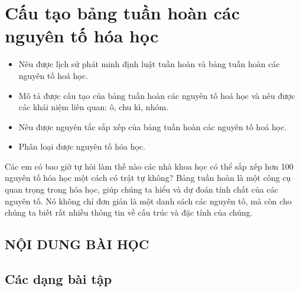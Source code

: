 \section{Cấu tạo bảng tuần hoàn các nguyên tố hóa học}
\begin{Muctieu}
	\begin{itemize}
		\item  Nêu được lịch sử phát minh định luật tuần hoàn và bảng tuần hoàn các nguyên tố hoá học.
		\item  Mô tả được cấu tạo của bảng tuần hoàn các nguyên tố hoá học và nêu được các khái niệm liên quan: ô, chu kì, nhóm.
		\item  Nêu được nguyên tắc sắp xếp của bảng tuần hoàn các nguyên tố hoá học.
		\item  Phân loại được nguyên tố hóa học.
	\end{itemize}
\end{Muctieu}
\begin{kd}
	Các em có bao giờ tự hỏi làm thế nào các nhà khoa học có thể sắp xếp hơn 100 nguyên tố hóa học một cách có trật tự không?
	Bảng tuần hoàn là một công cụ quan trọng trong hóa học, giúp chúng ta hiểu và dự đoán tính chất của các nguyên tố. Nó không chỉ đơn giản là một danh sách các nguyên tố, mà còn cho chúng ta biết rất nhiều thông tin về cấu trúc và đặc tính của chúng.
\end{kd}
\subsection{NỘI DUNG BÀI HỌC}
	
\subsection{Các dạng bài tập}
	










